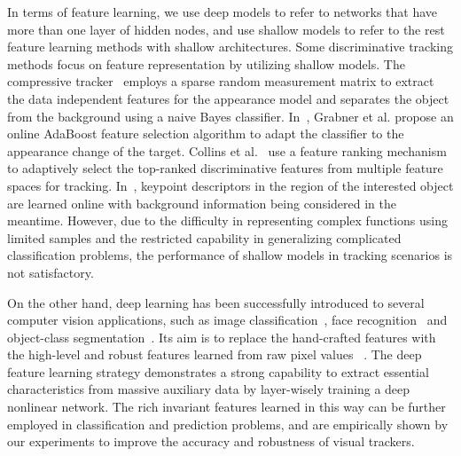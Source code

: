 \documentclass[preprint,12pt,review]{elsarticle}
\begin{document}
In terms of feature learning, we use deep models to refer to networks that have more than one layer of hidden nodes, and use shallow models to refer to the rest feature learning methods with shallow architectures.
Some discriminative tracking methods focus on feature representation by utilizing shallow models.
The compressive tracker~\cite{zhang2012real} employs a sparse random measurement matrix to extract the data independent features for the appearance model and separates the object from the background using a naive Bayes classifier.
In~\cite{grabner2006real}, Grabner et al. propose an online AdaBoost feature selection algorithm to adapt the classifier to the appearance change of the target.
Collins et al.~\cite{collins2005online} use a feature ranking mechanism to adaptively select the top-ranked discriminative features from multiple feature spaces for tracking.
In~\cite{grabner2007learning}, keypoint descriptors in the region of the interested object are learned online with background information being considered in the meantime.
However, due to the difficulty in representing complex functions using limited samples and the restricted capability in generalizing complicated classification problems, the performance of shallow models in tracking scenarios is not satisfactory.

On the other hand, deep learning has been successfully introduced to several computer vision applications, such as image classification~\cite{krizhevsky2012imagenet}, face recognition~\cite{sun2013hybrid} and object-class segmentation~\cite{schulz2012learning}.
Its aim is to replace the hand-crafted features with the high-level and robust features learned from raw pixel values ~\cite{zhuang2016fast,  hinton2006reducing, le2013building, coates2012emergence, marc2007sparse}.
The deep feature learning strategy demonstrates a strong capability to extract essential characteristics from massive  auxiliary data by layer-wisely training a deep nonlinear network.
The rich invariant features learned in this way can be further employed in classification and prediction problems, and are empirically shown by our experiments to improve the accuracy and robustness of visual trackers.
\end{document}
